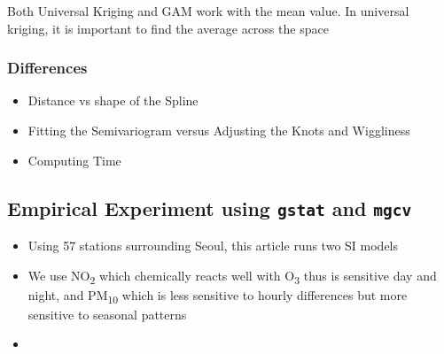 Both Universal Kriging and GAM work with the mean value. In universal
kriging, it is important to find the average across the space

\hypertarget{differences}{%
\subsubsection{Differences}\label{differences}}

\begin{itemize}
\tightlist
\item
  Distance vs shape of the Spline
\item
  Fitting the Semivariogram versus Adjusting the Knots and Wiggliness
\item
  Computing Time
\end{itemize}

\hypertarget{empirical-experiment-using-gstat-and-mgcv}{%
\subsection{\texorpdfstring{Empirical Experiment using \texttt{gstat}
and
\texttt{mgcv}}{Empirical Experiment using gstat and mgcv}}\label{empirical-experiment-using-gstat-and-mgcv}}

\begin{itemize}
\tightlist
\item
  Using 57 stations surrounding Seoul, this article runs two SI models
\item
  We use NO\textsubscript{2} which chemically reacts well with
  O\textsubscript{3} thus is sensitive day and night, and
  PM\textsubscript{10} which is less sensitive to hourly differences but
  more sensitive to seasonal patterns
\item
\end{itemize}



\address{%
Hyesop Shin\\
MRC/CSO Social and Public Health Sciences Unit, University of Glasgow\\%
Berkeley Square, 99 Berkeley Street, Glasgow, G3 7HR\\
%
\url{https://www.gla.ac.uk/researchinstitutes/healthwellbeing/staff/hyesopshin/}\\%
%
\href{mailto:hyesop.shin@glasgow.ac.uk}{\nolinkurl{hyesop.shin@glasgow.ac.uk}}%
}
